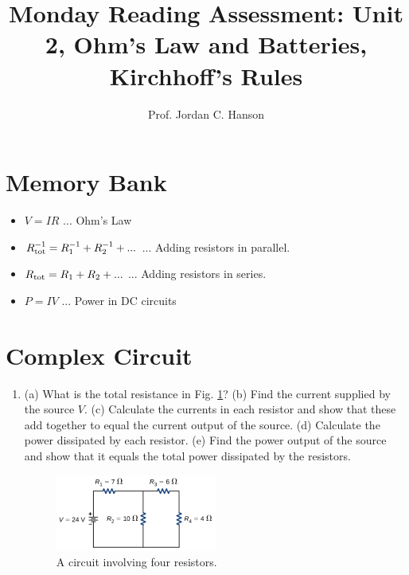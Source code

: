 \documentclass{article}
\begin{document}
\title{Monday Reading Assessment: Unit 2, Ohm's Law and Batteries, Kirchhoff's Rules}
\author{Prof. Jordan C. Hanson}

\maketitle

\section{Memory Bank}

\begin{itemize}
\item $V = IR$ ... Ohm's Law
\item $R^{-1}_{\rm tot} = R_1^{-1} + R_2^{-1} + ...$ ... Adding resistors in parallel.
\item $R_{\rm tot} = R_1 + R_2 + ...$ ... Adding resistors in series.
\item $P = IV$ ... Power in DC circuits
\end{itemize}

\section{Complex Circuit}

\begin{enumerate}
\item (a) What is the total resistance in Fig. \ref{fig:dura}? (b) Find the current supplied by the source $V$. (c) Calculate the currents in each resistor and show that these add together to equal the current output of the source. (d) Calculate the power dissipated by each resistor. (e) Find the power output of the source and show that it equals the total power dissipated by the resistors.
\begin{figure}[ht]
\centering
\includegraphics[width=0.5\textwidth]{circuit_series_parallel.png}
\caption{\label{fig:dura} A circuit involving four resistors.}
\end{figure}
\end{enumerate}
\end{document}
